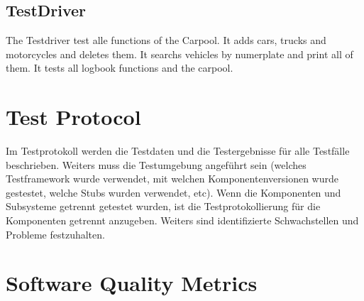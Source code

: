 \subsection{TestDriver}
The Testdriver test alle functions of the Carpool. It adds cars, trucks and motorcycles and deletes them.
It searchs vehicles by numerplate and print all of them. It tests all logbook functions and the carpool.


\section{Test Protocol}

Im Testprotokoll werden die Testdaten und die Testergebnisse für alle Testfälle beschrieben. Weiters muss die Testumgebung angeführt sein (welches Testframework
wurde verwendet, mit welchen Komponentenversionen wurde gestestet, welche Stubs
wurden verwendet, etc). Wenn die Komponenten und Subsysteme getrennt getestet
wurden, ist die Testprotokollierung für die Komponenten getrennt anzugeben. Weiters sind identifizierte Schwachstellen und Probleme festzuhalten.


\section{Software Quality Metrics}



